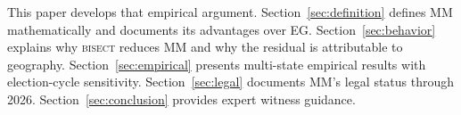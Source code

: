 This paper develops that empirical argument. Section~\ref{sec:definition} defines MM
mathematically and documents its advantages over EG. Section~\ref{sec:behavior}
explains why \textsc{bisect} reduces MM and why the residual is attributable to
geography. Section~\ref{sec:empirical} presents multi-state empirical results with
election-cycle sensitivity. Section~\ref{sec:legal} documents MM's legal status
through 2026. Section~\ref{sec:conclusion} provides expert witness guidance.
